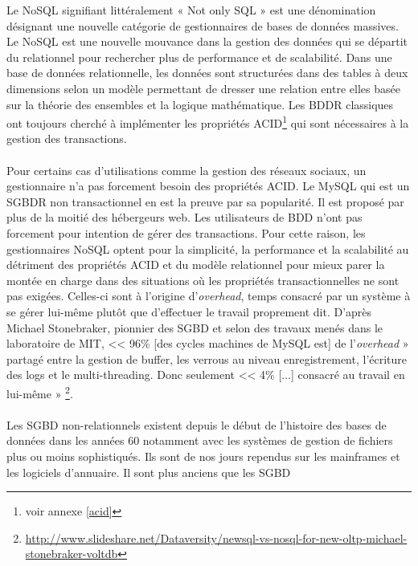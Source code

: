 Le \textsf{NoSQL} signifiant littéralement « \textsf{Not only SQL} »
est une dénomination désignant une nouvelle catégorie de gestionnaires
de bases de données massives. Le \textsf{NoSQL} est une nouvelle
mouvance dans la gestion des données qui se départit du relationnel 
pour rechercher plus de performance et de scalabilité\cite{RickCattell}. Dans une
base de données relationnelle, les données sont structurées dans des
tables à deux dimensions selon un modèle permettant de dresser une
relation entre elles basée sur la théorie des ensembles et la logique
mathématique\cite{BDDR}. Les \textsf{BDDR} classiques ont toujours cherché à
implémenter les propriétés \textsf{ACID}\footnote{voir annexe
  \ref{acid}} qui sont nécessaires à la gestion des
transactions.  
\\ 
\\ 
Pour certains cas d'utilisations comme la gestion des réseaux sociaux,
un gestionnaire n'a pas forcement besoin des
propriétés \textsf{ACID}. Le
\textsf{MySQL} qui est un \textsf{SGBDR} non transactionnel en est la
preuve par sa popularité. Il est proposé par plus de la moitié des
hébergeurs \textsf{web}. Les utilisateurs de \textsf{BDD} n'ont pas
forcement pour intention de gérer des transactions. Pour cette raison,
les gestionnaires \textsf{NoSQL} optent pour la simplicité, la
performance et la scalabilité au détriment des propriétés
\textsf{ACID} et du modèle relationnel pour mieux parer la montée en
charge dans des situations où les propriétés transactionnelles ne sont
pas exigées. Celles-ci sont à l'origine d'\textit{overhead}, temps
consacré par un système à se gérer lui-même plutôt que d'effectuer le
travail proprement dit. D'après \textsf{Michael Stonebraker}, pionnier
des \textsf{SGBD} et selon des travaux menés dans le laboratoire
de \textsf{MIT}, << 96\% [des cycles machines de \textsf{MySQL} est] de
l’\textit{overhead} » partagé entre la gestion de \textsf{buffer}, les
verrous au niveau enregistrement, l’écriture des \textsf{logs} et
le \textsf{multi-threading}. Donc seulement << 4\% [...] consacré au
travail en lui-même »
\footnote{\url{http://www.slideshare.net/Dataversity/newsql-vs-nosql-for-new-oltp-michael-stonebraker-voltdb}}.
\\ 
\\ 
Les \textsf{SGBD} non-relationnels existent depuis
le début de l'histoire des bases de données dans les années $60$
notamment avec les systèmes de gestion de fichiers plus ou moins
sophistiqués. Ils sont de nos jours rependus sur les mainframes et les
logiciels d'annuaire. Il sont plus anciens que les \textsf{SGBD}

